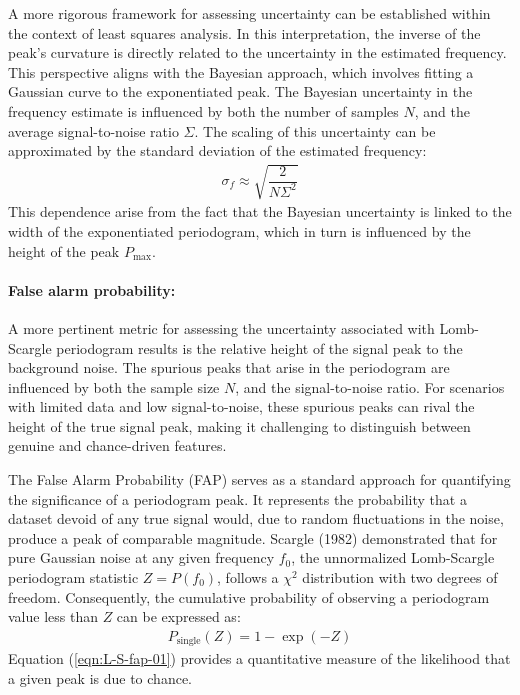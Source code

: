     			A more rigorous framework for assessing uncertainty can be established within the context of least squares analysis. In this interpretation, the inverse of the peak's curvature is directly related to the uncertainty in the estimated frequency. This perspective aligns with the Bayesian approach, which involves fitting a Gaussian curve to the exponentiated peak. The Bayesian uncertainty in the frequency estimate is influenced by both the number of samples $N$, and the average signal-to-noise ratio $\Sigma$. The scaling of this uncertainty can be approximated by the standard deviation of the estimated frequency:
    			\begin{align}
    				\sigma_f\approx\sqrt{\dfrac{2}{N\Sigma^2}} \label{eqn:stddev-est-freq}
    			\end{align}
    			This dependence arise from the fact that the Bayesian uncertainty is linked to the width of the exponentiated periodogram, which in turn is influenced by the height of the peak $P_\text{max}$.
    			
    			\paragraph{False alarm probability:}
    			A more pertinent metric for assessing the uncertainty associated with Lomb-Scargle periodogram results is the relative height of the signal peak to the background noise. The spurious peaks that arise in the periodogram are influenced by both the sample size $N$, and the signal-to-noise ratio. For scenarios with limited data and low signal-to-noise, these spurious peaks can rival the height of the true signal peak, making it challenging to distinguish between genuine and chance-driven features.
    			
    			The False Alarm Probability (FAP) serves as a standard approach for quantifying the significance of a periodogram peak. It represents the probability that a dataset devoid of any true signal would, due to random fluctuations in the noise, produce a peak of comparable magnitude. Scargle (1982) demonstrated that for pure Gaussian noise at any given frequency $f_0$, the unnormalized Lomb-Scargle periodogram statistic $Z=P(f_0)$, follows a $\chi^2$ distribution with two degrees of freedom. Consequently, the cumulative probability of observing a periodogram value less than $Z$ can be expressed as:
    			\begin{align}
    				P_\text{single}(Z)=1-\exp(-Z) \label{eqn:L-S-fap-01}
    			\end{align}
    			Equation (\ref{eqn:L-S-fap-01}) provides a quantitative measure of the likelihood that a given peak is due to chance.
    			
